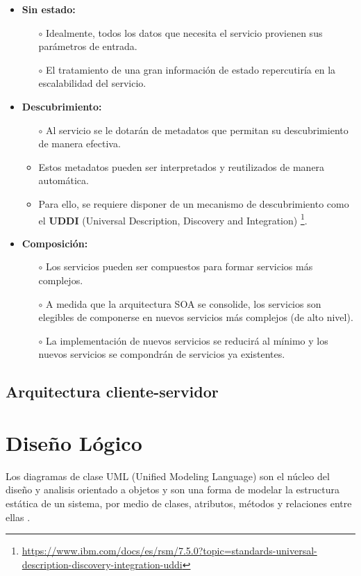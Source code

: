 \begin{itemize}
    \item \textbf{Sin estado:}
    \begin{itemize}
        \item [$\circ$] Idealmente, todos los datos que necesita el servicio provienen sus parámetros de entrada.
        \item [$\circ$] El tratamiento de una gran información de estado repercutiría en la escalabilidad del servicio.
    \end{itemize}
    \item \textbf{Descubrimiento:}
    \begin{itemize}
        \item [$\circ$] Al servicio se le dotarán de metadatos que permitan su descubrimiento de manera efectiva.
        \item Estos metadatos pueden ser interpretados y reutilizados de manera automática.
        \item Para ello, se requiere disponer de un mecanismo de descubrimiento como el \textbf{UDDI} (Universal Description, Discovery and Integration) \footnote{\url{https://www.ibm.com/docs/es/rsm/7.5.0?topic=standards-universal-description-discovery-integration-uddi}}.
    \end{itemize}
    \item \textbf{Composición:}
    \begin{itemize}
        \item [$\circ$] Los servicios pueden ser compuestos para formar servicios más complejos.
        \item [$\circ$] A medida que la arquitectura SOA se consolide, los servicios son elegibles de componerse en nuevos servicios más complejos (de alto nivel).
        \item [$\circ$]La implementación de nuevos servicios se reducirá al mínimo y los nuevos servicios se compondrán de servicios ya existentes.
    \end{itemize}
\end{itemize}

\subsection{Arquitectura cliente-servidor}

\section{Diseño Lógico}

Los diagramas de clase UML (Unified Modeling Language) son el núcleo del diseño y analisis orientado a objetos y son una forma de modelar la estructura estática de un sistema, por medio de clases, atributos, métodos y relaciones entre ellas \cite{herchi2012user}.\newline

